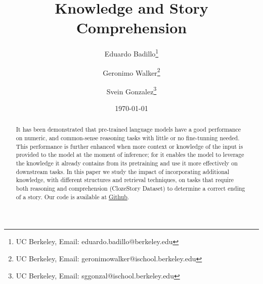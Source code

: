 \documentclass{article}
\title{Knowledge and Story Comprehension}
\author{Eduardo Badillo\thanks{UC Berkeley, Email: eduardo.badillo@berkeley.edu} \and Geronimo Walker\thanks{UC Berkeley, Email: 
geronimowalker@ischool.berkeley.edu} \and   Svein Gonzalez\thanks{UC Berkeley, Email: 
sggonzal@ischool.berkeley.edu}}
\date{\today}
\begin{document}
\maketitle

\begin{abstract}
\noindent %
It has been demonstrated that pre-trained language models have a good performance on numeric, and common-sense reasoning tasks with little or no fine-tunning needed. This performance is further enhanced when more context or knowledge of the input is provided to the model at the moment of inference; for it enables the model to leverage the knowledge it already contains from its pretraining and use it more effectively on downstream tasks. In this paper we study the impact of incorporating additional knowledge, with different structures and retrieval techniques, on tasks that require both reasoning and comprehension (ClozeStory Dataset) to determine a correct ending of a story. Our code is available at \href{https://github.com/sveinerss/w266_project}{Github}.
\end{abstract}
\end{document}
